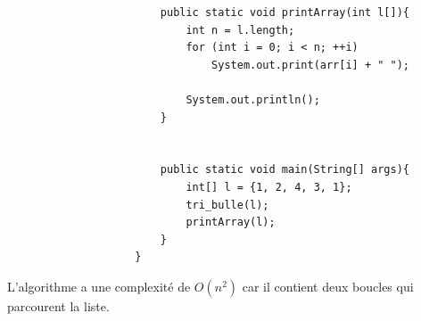 \begin{Exercice} [20 minutes]
\begin{verbatim}
                        public static void printArray(int l[]){ 
                            int n = l.length; 
                            for (int i = 0; i < n; ++i) 
                                System.out.print(arr[i] + " "); 
                      
                            System.out.println(); 
                        } 
              
                        
                        public static void main(String[] args){
                            int[] l = {1, 2, 4, 3, 1};
                            tri_bulle(l);
                            printArray(l);
                        }
                    }
                \end{verbatim}
        
        L'algorithme a une complexité de $O(n^2)$ car il contient deux boucles qui parcourent la liste.
    
\end{Exercice}

